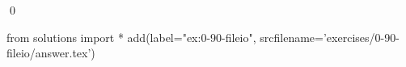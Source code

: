 
\begin{ex}
  \label{ex:0-90-fileio}
  
  \qed
\end{ex}
\begin{python0}
from solutions import *
add(label="ex:0-90-fileio",
    srcfilename='exercises/0-90-fileio/answer.tex')
\end{python0}
